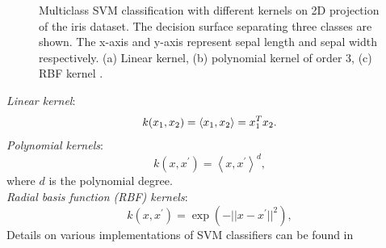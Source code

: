 \begin{figure}[h!]
\centering
{}
\caption{Multiclass SVM classification with different kernels on 2D projection of the iris dataset. The decision surface separating three classes are shown. The x-axis and y-axis represent sepal length and sepal width respectively. (a) Linear kernel, (b) polynomial kernel of order 3, (c) RBF kernel \citep{scikit-learn}.}
\label{fig:svm-kernels}
\end{figure}
\emph{Linear kernel}:\\
\begin{equation}
\label{eq:linear-kernel}
k(\x_1,\x_2) = \left\langle \x_1, \x_2 \right\rangle = \x_1^T \x_2.
\end{equation} 
\emph{Polynomial kernels}:\\
\begin{equation}
\label{eq:poly-kernel}
k(x,x^{\prime}) = \left\langle x,x^{\prime} \right\rangle^d, 
\end{equation}
where $d$ is the polynomial degree.\\
\emph{Radial basis function (RBF) kernels}:\\
\begin{equation}
\label{eq:rbf-kernel}
k(x,x^{\prime}) = \exp(- ||x-x^{\prime}||^2), 
\end{equation}
Details on various implementations of SVM classifiers can be found in \citep{chang_libsvm:_2011}

